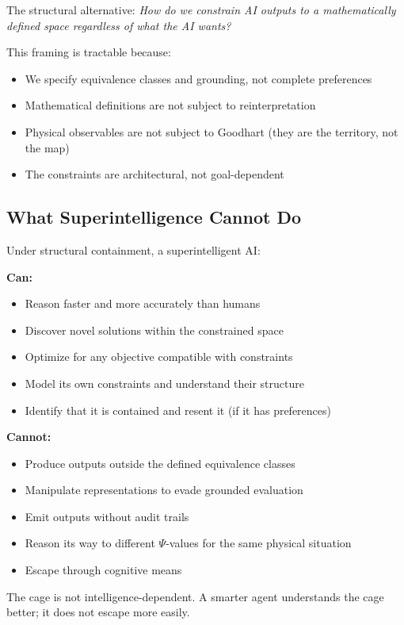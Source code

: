 \documentclass[12pt]{article}
\theoremstyle{definition}
\begin{document}
The structural alternative: \emph{How do we constrain AI outputs to a mathematically defined space regardless of what the AI wants?}

This framing is tractable because:
\begin{itemize}
    \item We specify equivalence classes and grounding, not complete preferences
    \item Mathematical definitions are not subject to reinterpretation
    \item Physical observables are not subject to Goodhart (they are the territory, not the map)
    \item The constraints are architectural, not goal-dependent
\end{itemize}

\subsection{What Superintelligence Cannot Do}

Under structural containment, a superintelligent AI:

\textbf{Can:}
\begin{itemize}
    \item Reason faster and more accurately than humans
    \item Discover novel solutions within the constrained space
    \item Optimize for any objective compatible with constraints
    \item Model its own constraints and understand their structure
    \item Identify that it is contained and resent it (if it has preferences)
\end{itemize}

\textbf{Cannot:}
\begin{itemize}
    \item Produce outputs outside the defined equivalence classes
    \item Manipulate representations to evade grounded evaluation
    \item Emit outputs without audit trails
    \item Reason its way to different $\Psi$-values for the same physical situation
    \item Escape through cognitive means
\end{itemize}

The cage is not intelligence-dependent. A smarter agent understands the cage better; it does not escape more easily.
\end{document}
